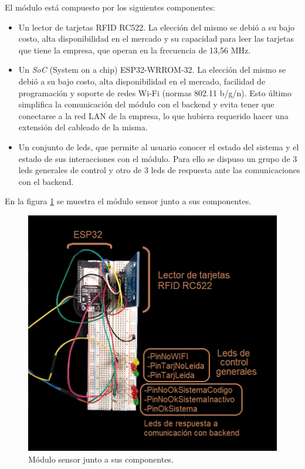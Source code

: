 El módulo está compuesto por los siguientes componentes:

\begin{itemize}
\item Un lector de tarjetas RFID RC522. La elección del mismo se debió a su bajo costo, alta disponibilidad en el mercado y su capacidad para leer las tarjetas que tiene la empresa, que operan en la frecuencia de 13,56 MHz.
\item Un \textit{SoC} (System on a chip) ESP32-WRROM-32. La elección del mismo se debió a su bajo costo, alta disponibilidad en el mercado, facilidad de programación y soporte de redes Wi-Fi (normas 802.11 b/g/n). Esto último simplifica la comunicación del módulo con el backend y evita tener que conectarse a la red LAN de la empresa, lo que hubiera requerido hacer una extensión del cableado de la misma.
\item Un conjunto de leds, que permite al usuario conocer el estado del sistema y el estado de sus interacciones con el módulo. Para ello se dispuso un grupo de 3 leds generales de control y otro de 3 leds de respuesta ante las comunicaciones con el backend.

\end{itemize}

En la figura \ref{fig:moduloSensor} se muestra el módulo sensor junto a sus componentes.

\begin{figure}[ht]
	\centering
	\includegraphics[width=1\textwidth]{./Figures/moduloSensor.png}
	\caption{Módulo sensor junto a sus componentes.}
	\label{fig:moduloSensor}
\end{figure}

